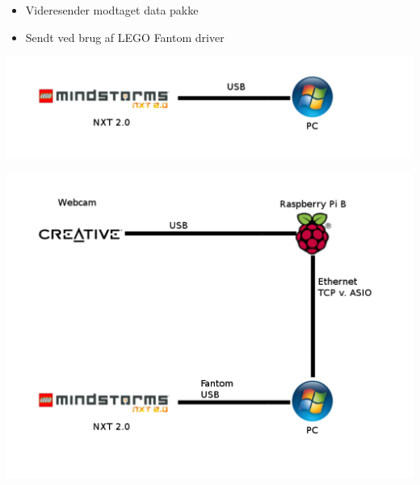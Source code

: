 \begin{frame}[fragile]{\insertsection}{\insertsubsection}
\begin{itemize}
	\item Videresender modtaget data pakke
	\item Sendt ved brug af LEGO Fantom driver
\end{itemize}
\includegraphics[width=1\textwidth]{pictures/windowslego.pdf}
\end{frame}

\begin{frame}[fragile]{\insertsection}{\insertsubsection}
\includegraphics[width=1\textwidth]{pictures/opsaetning.pdf}
\end{frame}